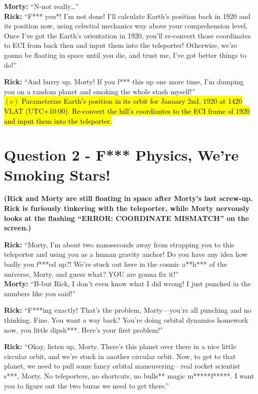 \documentclass[a4paper, 12pt]{exam}
\begin{document}
\noindent \textbf{Morty:} “N-not really…”\\

\noindent \textbf{Rick:} “F*** you*! I’m not done! I’ll calculate Earth’s position back in 1920 and its position now, using celestial mechanics way above your comprehension level. Once I’ve got the Earth’s orientation in 1920, you’ll re-convert those coordinates to ECI from back then and input them into the teleporter! Otherwise, we’re gonna be floating in space until you die, and trust me, I’ve got better things to do!”

\bigskip

\noindent \textbf{Rick:} “And hurry up, Morty! If you f*** this up one more time, I’m dumping you on a random planet and smoking the whole stash myself!” \\

\hl{$(c)$ Parameterize Earth's position in its orbit for January 2nd, 1920 at 1420 VLAT (UTC+10:00). Re-convert the hill's coordiantes to the ECI frame of 1920 and input them into the teleporter.}

	
	\pagebreak
	
	\section*{Question 2 - F*** Physics, We’re Smoking Stars!}

\noindent \textbf{(Rick and Morty are still floating in space after Morty’s last screw-up. Rick is furiously tinkering with the teleporter, while Morty nervously looks at the flashing “ERROR: COORDINATE MISMATCH” on the screen.)}

\bigskip
\noindent \textbf{Rick:} “Morty, I’m about two nanoseconds away from strapping you to this teleporter and using you as a human gravity anchor! Do you have any idea how badly you f***ed up?! We’re stuck out here in the cosmic a**h*** of the universe, Morty, and guess what? YOU are gonna fix it!” \\

\noindent \textbf{Morty:} “B-but Rick, I don’t even know what I did wrong! I just punched in the numbers like you said!” \bigskip

\noindent \textbf{Rick:} “F***ing exactly! That’s the problem, Morty—you’re all punching and no thinking. Fine. You want a way back? You’re doing orbital dynamics homework now, you little dipsh***. Here’s your first problem!”

\bigskip

\noindent \textbf{Rick:} “Okay, listen up, Morty. There’s this planet over there in a nice little circular orbit, and we’re stuck in another circular orbit. Now, to get to that planet, we need to pull some fancy orbital maneuvering—real rocket scientist s***, Morty. No teleporters, no shortcuts, no bulls** magic m*****f*****. I want you to figure out the two burns we need to get there.”
\bigskip
\end{document}
